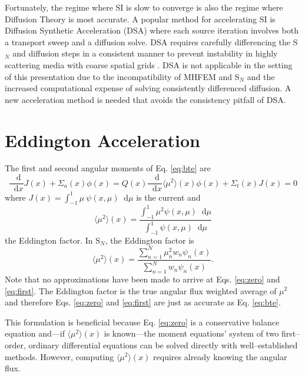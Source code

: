 \documentclass{anstrans}
\newcommand{\SN}{S$_N$\xspace}
\newcommand{\ud}{\mathop{}\!\mathrm{d}} %
\newcommand{\dderiv}[2]{\frac{\ud #1}{\ud #2}}
\newcommand{\edd}{\langle \mu^2 \rangle}
\begin{document}
	Fortunately, the regime where SI is slow to converge is also the regime where Diffusion Theory is most accurate. A popular method for accelerating SI is Diffusion Synthetic Acceleration (DSA) where each source iteration involves both a transport sweep and a diffusion solve. DSA requires carefully differencing the \SN and diffusion steps in a consistent manner to prevent instability in highly scattering media with coarse spatial grids \cite{alcouffe,morel}. DSA is not applicable in the setting of this presentation due to the incompatibility of MHFEM and \SN and the increased computational expense of solving consistently differenced diffusion. A new acceleration method is needed that avoids the consistency pitfall of DSA. 

\section{Eddington Acceleration}
	The first and second angular moments of Eq. \ref{eq:bte} are 
		\begin{subequations} 
		\begin{equation} \label{eq:zero}
			\dderiv{}{x} J(x) + \Sigma_a(x) \phi(x) = Q(x) 
		\end{equation} 
		\begin{equation} \label{eq:first}
			\frac{\ud}{\ud x} \edd(x) \phi(x) + \Sigma_t(x) J(x) = 0  
		\end{equation}
		\end{subequations}
	where $J(x) = \int_{-1}^{1} \mu \ \psi(x, \mu) \ud \mu$ is the current and 
		\begin{equation} \label{eq:eddington} 
			\edd(x) = \frac{\int_{-1}^1 \mu^2 \psi(x, \mu) \ud \mu}{\int_{-1}^1 \psi(x, \mu) \ud \mu}
		\end{equation}
	the Eddington factor. In \SN, the Eddington factor is 
		\begin{equation} \label{eq:edd_sn}
			\edd(x) = \frac{\sum_{n=1}^N \mu_n^2 w_n\psi_n(x)}{\sum_{n=1}^N w_n \psi_n(x)}.
		\end{equation}
	Note that no approximations have been made to arrive at Eqs. \ref{eq:zero} and \ref{eq:first}. The Eddington factor is the true angular flux weighted average of $\mu^2$ and therefore Eqs. \ref{eq:zero} and \ref{eq:first} are just as accurate as Eq. \ref{eq:bte}. 

	This formulation is beneficial because Eq. \ref{eq:zero} is a conservative balance equation and---if $\edd(x)$ is known---the moment equations' system of two first--order, ordinary differential equations can be solved directly with well--established methods. However, computing $\edd(x)$ requires already knowing the angular flux. 
\end{document}
